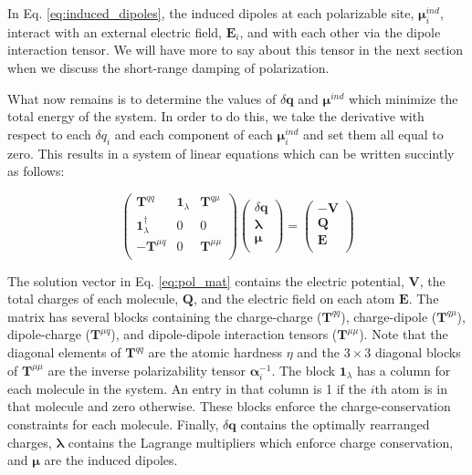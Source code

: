 \documentclass[journal=jacsat,manuscript=article]{achemso}
\begin{document}
In Eq. \ref{eq:induced_dipoles}, the induced dipoles at each polarizable site, $\bm{\mu}_i^{ind}$,
interact with an external electric field, $\bm{E}_i$, and with each other via the dipole interaction tensor.
We will have more to say about this tensor in the next section when we discuss the short-range damping of polarization.

What now remains is to determine the values of $\delta \bm{q}$ and $\bm{\mu}^{ind}$
which minimize the total energy of the system. In order to do this, we take
the derivative with respect to each $\delta q_i$ and each component of each
$\bm{\mu}_i^{ind}$ and set them all equal to zero. This results in a system of linear
equations which can be written succintly as follows:


\begin{equation}
  \begin{pmatrix}
    \bm{T}^{qq} & \bm{1}_\lambda & \bm{T}^{q\mu} \\
    \bm{1}_\lambda^\dagger & 0 & 0 \\
    -\bm{T}^{\mu q} & 0 & \bm{T}^{\mu\mu} \\
  \end{pmatrix}
  \begin{pmatrix}
    \delta \bm{q} \\
    \bm{\lambda} \\
    \bm{\mu} \\
  \end{pmatrix}
  =
  \begin{pmatrix}
    -\bm{V} \\
    \bm{Q} \\
    \bm{E} \\
  \end{pmatrix}
  \label{eq:pol_mat}
\end{equation}

The solution vector in Eq. \ref{eq:pol_mat} contains the electric potential,
$\bm{V}$, the total charges of each molecule, $\bm{Q}$, and the electric
field on each atom $\bm{E}$. The matrix has several blocks containing the
charge-charge ($\bm{T}^{qq}$), charge-dipole ($\bm{T}^{q\mu}$),
dipole-charge ($\bm{T}^{\mu q}$), and dipole-dipole interaction tensors ($\bm{T}^{\mu\mu}$).
Note that the diagonal elements of $\bm{T}^{qq}$ are the atomic hardness $\eta$ and
the $3\times 3$ diagonal blocks of $\bm{T}^{\mu\mu}$ are the inverse polarizability tensor
$\bm{\alpha}_i^{-1}$. The block $\bm{1}_\lambda$ has a column for each molecule in the system.
An entry in that column is 1 if the $i$th atom is in that molecule and zero otherwise.
These blocks enforce the charge-conservation constraints for each molecule.
Finally, $\delta\bm{q}$ contains the optimally rearranged charges, $\bm{\lambda}$ contains
the Lagrange multipliers which enforce charge conservation, and $\bm{\mu}$ are the induced dipoles.
\end{document}
